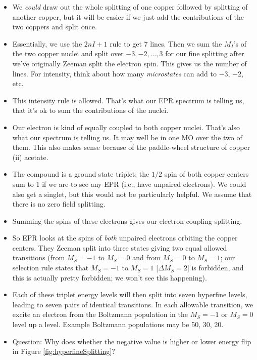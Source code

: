 \documentclass[../notes.tex]{subfiles}
\begin{document}
\begin{itemize}
    \begin{itemize}
        \item We \emph{could} draw out the whole splitting of one copper followed by splitting of another copper, but it will be easier if we just add the contributions of the two coppers and split once.
        \item Essentially, we use the $2nI+1$ rule to get 7 lines. Then we sum the $M_I$'s of the two copper nuclei and split over $-3,-2,\dots,3$ for our fine splitting after we've originally Zeeman split the electron spin. This gives us the number of lines. For intensity, think about how many \emph{microstates} can add to $-3$, $-2$, etc.
        \item This intensity rule is allowed. That's what our EPR spectrum is telling us, that it's ok to sum the contributions of the nuclei.
        \item Our electron is kind of equally coupled to both copper nuclei. That's also what our spectrum is telling us. It may well be in one MO over the two of them. This also makes sense because of the paddle-wheel structure of copper (ii) acetate.
        \item The compound is a ground state triplet; the $1/2$ spin of both copper centers sum to 1 if we are to see any EPR (i.e., have unpaired electrons). We could also get a singlet, but this would not be particularly helpful. We assume that there is no zero field splitting.
        \item Summing the spins of these electrons gives our electron coupling splitting.
        \item So EPR looks at the spins of \emph{both} unpaired electrons orbiting the copper centers. They Zeeman split into three states giving two equal allowed transitions (from $M_S=-1$ to $M_S=0$ and from $M_S=0$ to $M_S=1$; our selection rule states that $M_S=-1$ to $M_S=1$ [$\Delta M_S=2$] is forbidden, and this is actually pretty forbidden; we won't see this happening).
        \item Each of these triplet energy levels will then split into seven hyperfine levels, leading to seven pairs of identical transitions. In each allowable transition, we excite an electron from the Boltzmann population in the $M_S=-1$ or $M_S=0$ level up a level. Example Boltzmann populations may be 50, 30, 20.
        \item Question: Why does whether the negative value is higher or lower energy flip in Figure \ref{fig:hyperfineSplitting}?
        \begin{itemize}

\end{itemize}
\end{itemize}
\end{itemize}
\end{document}
